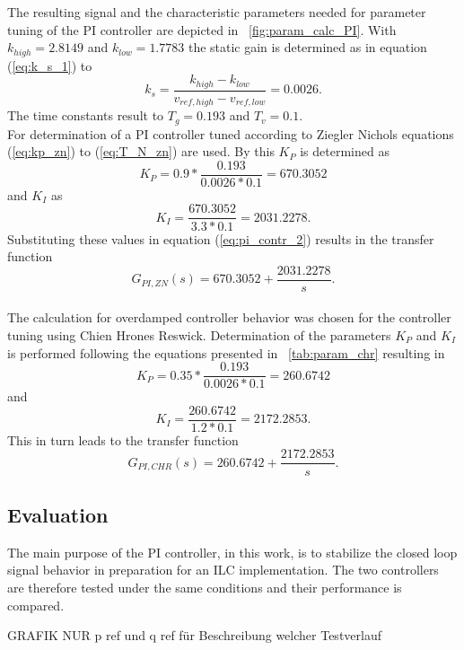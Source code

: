 The resulting signal and the characteristic parameters needed for parameter tuning of the PI controller are depicted in \figurename~\ref{fig:param_calc_PI}. With $k_{high}=2.8149$ and $k_{low}=1.7783$ the static gain is determined as in equation (\ref{eq:k_s_1}) to
\begin{equation}
  k_s = \frac{k_{high}-k_{low}}{v_{ref,high}-v_{ref,low}}= 0.0026.
\label{eq:k_s_2}
\end{equation}
The time constants result to $T_g=0.193$ and $T_v=0.1$.
\\For determination of a PI controller tuned according to Ziegler Nichols equations (\ref{eq:kp_zn}) to (\ref{eq:T_N_zn}) are used. By this $K_{P}$ is determined as
\begin{equation}
  K_{P} = 0.9*\frac{0.193}{0.0026*0.1}=670.3052
\end{equation}
and $K_I$ as
\begin{equation}
  K_{I}  = \frac{670.3052}{3.3*0.1}=2031.2278.
\end{equation}
Substituting these values in equation (\ref{eq:pi_contr_2}) results in the transfer function
\begin{equation}
  G_{PI,ZN}(s)=670.3052+\frac{2031.2278}{s}.
\end{equation}
\\The calculation for overdamped controller behavior was chosen for the controller tuning using Chien Hrones Reswick. Determination of the parameters $K_P$ and $K_I$ is performed following the equations presented in \tablename~\ref{tab:param_chr} resulting in
\begin{equation}
  K_P = 0.35*\frac{0.193}{0.0026*0.1}=260.6742
\end{equation}
and
\begin{equation}
  K_I = \frac{260.6742}{1.2*0.1}=2172.2853.
\end{equation}
This in turn leads to the transfer function
\begin{equation}
  G_{PI,CHR}(s)=260.6742+\frac{2172.2853}{s}.
\end{equation}
\subsection{Evaluation}
The main purpose of the PI controller, in this work, is to stabilize the closed loop signal behavior in preparation for an ILC implementation.
The two controllers are therefore tested under the same conditions and their performance is compared.


GRAFIK NUR p ref und q ref für Beschreibung welcher Testverlauf

